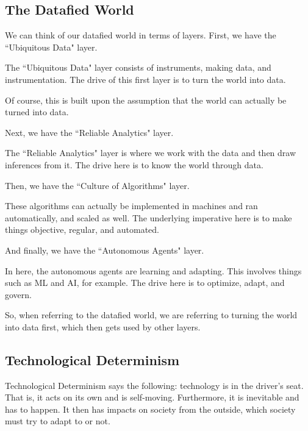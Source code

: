 \documentclass[openany]{book}
\begin{document}
\subsection{The Datafied World}
We can think of our datafied world in terms of layers. First, we have the ``Ubiquitous Data" layer.
\begin{defn}
	The ``Ubiquitous Data" layer consists of instruments, making data, and instrumentation. The drive of this first layer is to turn the world into data.
	
	Of course, this is built upon the assumption that the world can actually be turned into data.
\end{defn}

Next, we have the ``Reliable Analytics" layer.

\begin{defn}
	The ``Reliable Analytics" layer is where we work with the data and then draw inferences from it. The drive here is to know the world through data.
\end{defn}

Then, we have the ``Culture of Algorithms" layer.
\begin{defn}
	These algorithms can actually be implemented in machines and ran automatically, and scaled as well. The underlying imperative here is to make things objective, regular, and automated.
\end{defn}

And finally, we have the ``Autonomous Agents" layer.
\begin{defn}
	In here, the autonomous agents are learning and adapting. This involves things such as ML and AI, for example. The drive here is to optimize, adapt, and govern.
\end{defn}

So, when referring to the datafied world, we are referring to turning the world into data first, which then gets used by other layers.

\subsection{Technological Determinism}
\begin{defn}
	Technological Determinism says the following: technology is in the driver's seat. That is, it acts on its own and is self-moving. Furthermore, it is inevitable and has to happen. It then has impacts on society from the outside, which society must try to adapt to or not.
\end{defn}
\end{document}
